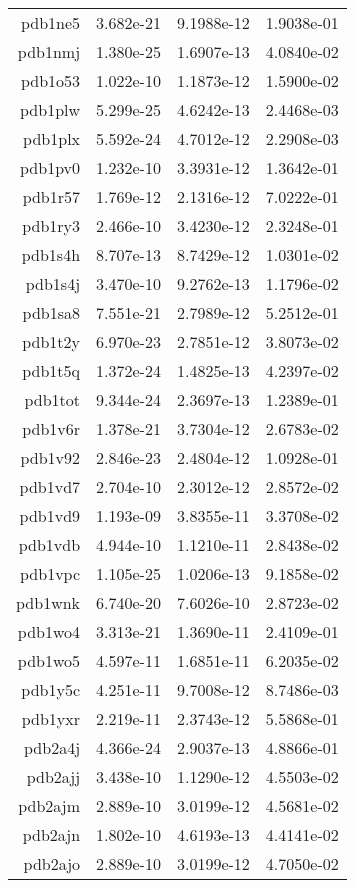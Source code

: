 \begin{xltabular}{\textwidth}{||rS[table-format=1.3e+2]S[table-format=1.4e+2]S[table-format=1.4e+2]||}
pdb1ne5 & 3.682e-21 & 9.1988e-12 & 1.9038e-01 \\
pdb1nmj & 1.380e-25 & 1.6907e-13 & 4.0840e-02 \\
pdb1o53 & 1.022e-10 & 1.1873e-12 & 1.5900e-02 \\
pdb1plw & 5.299e-25 & 4.6242e-13 & 2.4468e-03 \\
pdb1plx & 5.592e-24 & 4.7012e-12 & 2.2908e-03 \\
pdb1pv0 & 1.232e-10 & 3.3931e-12 & 1.3642e-01 \\
pdb1r57 & 1.769e-12 & 2.1316e-12 & 7.0222e-01 \\
pdb1ry3 & 2.466e-10 & 3.4230e-12 & 2.3248e-01 \\
pdb1s4h & 8.707e-13 & 8.7429e-12 & 1.0301e-02 \\
pdb1s4j & 3.470e-10 & 9.2762e-13 & 1.1796e-02 \\
pdb1sa8 & 7.551e-21 & 2.7989e-12 & 5.2512e-01 \\
pdb1t2y & 6.970e-23 & 2.7851e-12 & 3.8073e-02 \\
pdb1t5q & 1.372e-24 & 1.4825e-13 & 4.2397e-02 \\
pdb1tot & 9.344e-24 & 2.3697e-13 & 1.2389e-01 \\
pdb1v6r & 1.378e-21 & 3.7304e-12 & 2.6783e-02 \\
pdb1v92 & 2.846e-23 & 2.4804e-12 & 1.0928e-01 \\
pdb1vd7 & 2.704e-10 & 2.3012e-12 & 2.8572e-02 \\
pdb1vd9 & 1.193e-09 & 3.8355e-11 & 3.3708e-02 \\
pdb1vdb & 4.944e-10 & 1.1210e-11 & 2.8438e-02 \\
pdb1vpc & 1.105e-25 & 1.0206e-13 & 9.1858e-02 \\
pdb1wnk & 6.740e-20 & 7.6026e-10 & 2.8723e-02 \\
pdb1wo4 & 3.313e-21 & 1.3690e-11 & 2.4109e-01 \\
pdb1wo5 & 4.597e-11 & 1.6851e-11 & 6.2035e-02 \\
pdb1y5c & 4.251e-11 & 9.7008e-12 & 8.7486e-03 \\
pdb1yxr & 2.219e-11 & 2.3743e-12 & 5.5868e-01 \\
pdb2a4j & 4.366e-24 & 2.9037e-13 & 4.8866e-01 \\
pdb2ajj & 3.438e-10 & 1.1290e-12 & 4.5503e-02 \\
pdb2ajm & 2.889e-10 & 3.0199e-12 & 4.5681e-02 \\
pdb2ajn & 1.802e-10 & 4.6193e-13 & 4.4141e-02 \\
pdb2ajo & 2.889e-10 & 3.0199e-12 & 4.7050e-02 \\

\end{xltabular}
